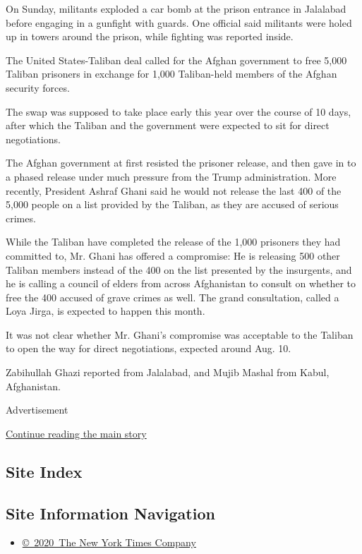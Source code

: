 On Sunday, militants exploded a car bomb at the prison entrance in
Jalalabad before engaging in a gunfight with guards. One official said
militants were holed up in towers around the prison, while fighting was
reported inside.

The United States-Taliban deal called for the Afghan government to free
5,000 Taliban prisoners in exchange for 1,000 Taliban-held members of
the Afghan security forces.

The swap was supposed to take place early this year over the course of
10 days, after which the Taliban and the government were expected to sit
for direct negotiations.

The Afghan government at first resisted the prisoner release, and then
gave in to a phased release under much pressure from the Trump
administration. More recently, President Ashraf Ghani said he would not
release the last 400 of the 5,000 people on a list provided by the
Taliban, as they are accused of serious crimes.

While the Taliban have completed the release of the 1,000 prisoners they
had committed to, Mr. Ghani has offered a compromise: He is releasing
500 other Taliban members instead of the 400 on the list presented by
the insurgents, and he is calling a council of elders from across
Afghanistan to consult on whether to free the 400 accused of grave
crimes as well. The grand consultation, called a Loya Jirga, is expected
to happen this month.

It was not clear whether Mr. Ghani's compromise was acceptable to the
Taliban to open the way for direct negotiations, expected around Aug.
10.

Zabihullah Ghazi reported from Jalalabad, and Mujib Mashal from Kabul,
Afghanistan.

Advertisement

\protect\hyperlink{after-bottom}{Continue reading the main story}

\hypertarget{site-index}{%
\subsection{Site Index}\label{site-index}}

\hypertarget{site-information-navigation}{%
\subsection{Site Information
Navigation}\label{site-information-navigation}}

\begin{itemize}
\tightlist
\item
  \href{https://help.nytimes.com/hc/en-us/articles/115014792127-Copyright-notice}{©~2020~The
  New York Times Company}
\end{itemize}

